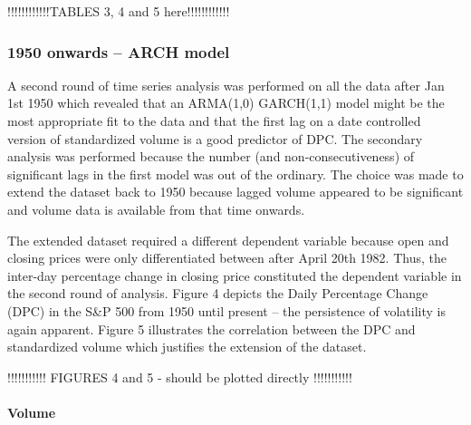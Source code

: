 \documentclass[11pt,preprint, authoryear]{elsarticle}
\numberwithin{equation}{section}
\numberwithin{figure}{section}
\numberwithin{table}{section}
\begin{document}
!!!!!!!!!!!!TABLES 3, 4 and 5 here!!!!!!!!!!!!

\hypertarget{onwards-arch-model}{%
\subsubsection{1950 onwards -- ARCH model}\label{onwards-arch-model}}

A second round of time series analysis was performed on all the data
after Jan 1st 1950 which revealed that an ARMA(1,0) GARCH(1,1) model
might be the most appropriate fit to the data and that the first lag on
a date controlled version of standardized volume is a good predictor of
DPC. The secondary analysis was performed because the number (and
non-consecutiveness) of significant lags in the first model was out of
the ordinary. The choice was made to extend the dataset back to 1950
because lagged volume appeared to be significant and volume data is
available from that time onwards.

The extended dataset required a different dependent variable because
open and closing prices were only differentiated between after April
20th 1982. Thus, the inter-day percentage change in closing price
constituted the dependent variable in the second round of analysis.
Figure 4 depicts the Daily Percentage Change (DPC) in the S\&P 500 from
1950 until present -- the persistence of volatility is again apparent.
Figure 5 illustrates the correlation between the DPC and standardized
volume which justifies the extension of the dataset.

!!!!!!!!!!! FIGURES 4 and 5 - should be plotted directly !!!!!!!!!!!

\hypertarget{volume}{%
\paragraph{Volume}\label{volume}}
\end{document}
